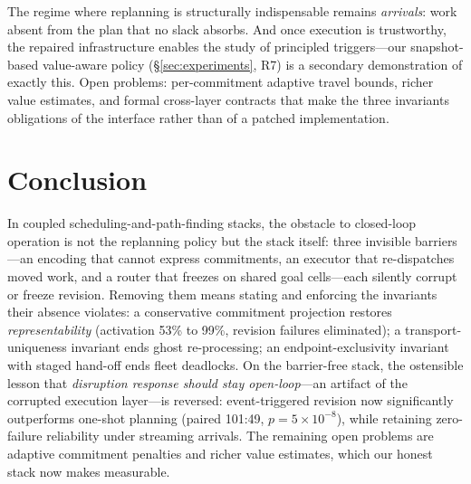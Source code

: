 \documentclass[twocolumn]{article}
\begin{document}
The regime where replanning is structurally indispensable remains
\emph{arrivals}: work absent from the plan that no slack absorbs.
And once execution is trustworthy, the repaired infrastructure enables
the study of principled triggers---our snapshot-based value-aware
policy (\S\ref{sec:experiments}, R7) is a secondary demonstration of
exactly this. Open problems: per-commitment adaptive travel bounds,
richer value estimates, and formal cross-layer contracts that make the
three invariants obligations of the interface rather than of a patched
implementation.

\section{Conclusion}
In coupled scheduling-and-path-finding stacks, the obstacle to
closed-loop operation is not the replanning policy but the stack itself:
three invisible barriers---an encoding that cannot express commitments,
an executor that re-dispatches moved work, and a router that freezes on
shared goal cells---each silently corrupt or freeze revision. Removing
them means stating and enforcing the invariants their absence violates:
a conservative commitment projection restores \emph{representability}
(activation 53\% to 99\%, revision failures eliminated); a
transport-uniqueness invariant ends ghost re-processing; an
endpoint-exclusivity invariant with staged hand-off ends fleet
deadlocks. On the barrier-free stack, the
ostensible lesson that \emph{disruption response should stay
open-loop}---an artifact of the corrupted execution
layer---is reversed: event-triggered revision now significantly
outperforms one-shot planning (paired 101:49, $p=5\times10^{-8}$),
while retaining zero-failure reliability under streaming arrivals. The remaining open problems are adaptive commitment penalties
and richer value estimates, which our honest stack now makes
measurable.



\end{document}
